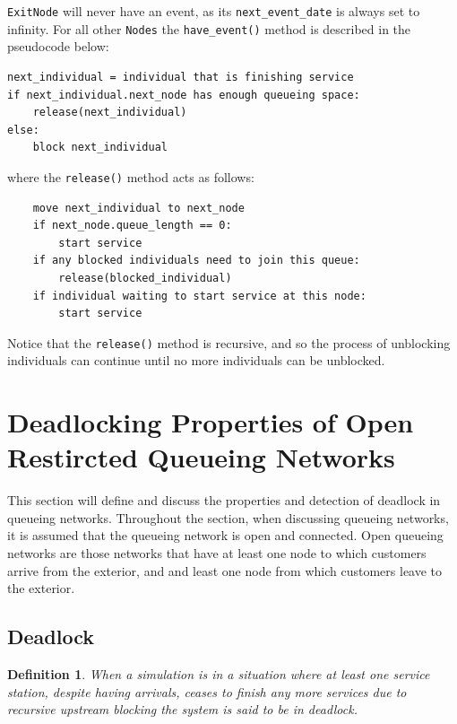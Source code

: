 \documentclass{article}
\newtheorem{definition}{Definition}
\begin{document}
\texttt{ExitNode} will never have an event, as its \texttt{next\_event\_date} is always set to infinity.
For all other \texttt{Nodes} the \texttt{have\_event()} method is described in the pseudocode below:

\begin{lstlisting}
next_individual = individual that is finishing service
if next_individual.next_node has enough queueing space:
    release(next_individual)
else:
    block next_individual
\end{lstlisting}

where the \texttt{release()} method acts as follows:

\begin{lstlisting}
    move next_individual to next_node
    if next_node.queue_length == 0:
        start service
    if any blocked individuals need to join this queue:
        release(blocked_individual)
    if individual waiting to start service at this node:
        start service
\end{lstlisting}

Notice that the \texttt{release()} method is recursive, and so the process of unblocking individuals can continue until no more individuals can be unblocked.


\section{Deadlocking Properties of Open Restircted Queueing Networks}\label{sec:deadlock}

This section will define and discuss the properties and detection of deadlock in queueing networks.
Throughout the section, when discussing queueing networks, it is assumed that
the queueing network is open and connected.
Open queueing networks are those networks that have at least one node to which customers arrive from the exterior, and and least one node from which customers leave to the exterior.

\subsection{Deadlock}

\begin{definition}
    When a simulation is in a situation where at least one service station,
    despite having arrivals, ceases to finish any more services
    due to recursive upstream blocking the system is said to be in deadlock.
\end{definition}
\end{document}
